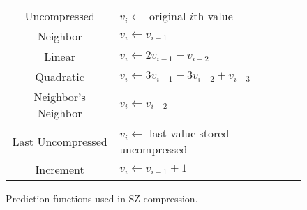 \begin{figure}
	\centering
	\begin{tabular}{cl}
		Uncompressed & \(v_i \gets \) original \(i\)th value \\
		Neighbor & \(v_i \gets v_{i-1}\) \\
		Linear & \(v_i \gets 2v_{i-1} - v_{i-2}\) \\
		Quadratic & \(v_i \gets 3v_{i-1} - 3v_{i-2} + v_{i-3}\) \\
		Neighbor's Neighbor & \(v_i \gets v_{i-2}\) \\
		Last Uncompressed & \(v_i \gets\) last value stored uncompressed \\
		Increment & \(v_i \gets v_{i-1}+1\)
	\end{tabular}

	\caption{Prediction functions used in SZ compression.}
	\label{fig:comp-sz-modes}
	
\end{figure}